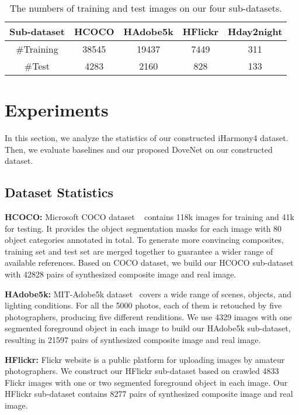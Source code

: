 \documentclass[10pt,twocolumn,letterpaper]{article}
\begin{document}
\setlength{\tabcolsep}{4pt}
\begin{table}
\centering
\begin{tabular}{|c|c|c|c|c|}
\hline
Sub-dataset & HCOCO & HAdobe5k & HFlickr & Hday2night\\
\hline
\#Training & 38545 & 19437 & 7449 & 311 \\
\hline
\#Test & 4283 & 2160 & 828 & 133 \\
\hline
\end{tabular}
\caption{The numbers of training and test images on our four sub-datasets.}
\label{tab:statistics}
\vspace{-12pt}
\end{table}

\section{Experiments}
In this section, we analyze the statistics of our constructed iHarmony4 dataset. Then, we evaluate baselines and our proposed DoveNet on our constructed dataset.

\subsection{Dataset Statistics}
\noindent\textbf{HCOCO: }Microsoft COCO dataset ~\cite{lin2014microsoft} contains 118k images for training and 41k for testing. It provides the object segmentation masks for each image with 80 object categories annotated in total. To generate more convincing composites, training set and test set are merged together to guarantee a wider range of available references. Based on COCO dataset, we build our HCOCO sub-dataset with 42828 pairs of synthesized composite image and real image.

\noindent\textbf{HAdobe5k: }MIT-Adobe5k dataset~ \cite{bychkovsky2011learning} covers a wide range of scenes, objects, and lighting conditions. For all the 5000 photos, each of them is retouched by five photographers, producing five different renditions. We use 4329 images with one segmented foreground object in each image to build our HAdobe5k sub-dataset, resulting in 21597 pairs of synthesized composite image and real image.

\noindent\textbf{HFlickr: }Flickr website is a public platform for uploading images by amateur photographers.
We construct our HFlickr sub-dataset based on crawled 4833 Flickr images with one or two segmented foreground object in each image. Our HFlickr sub-dataset contains 8277 pairs of synthesized composite image and real image.
\end{document}
